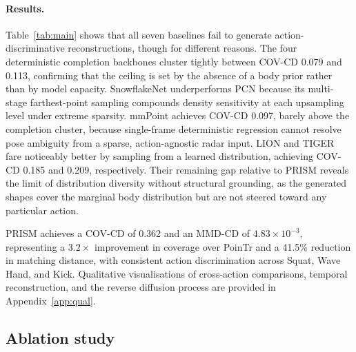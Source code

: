 \documentclass{article}
\begin{document}
\paragraph{Results.}
Table~\ref{tab:main} shows that all seven baselines fail to generate action-discriminative reconstructions, though for different reasons. The four deterministic completion backbones cluster tightly between COV-CD 0.079
and 0.113, confirming that the ceiling is set by the absence of a body prior rather
than by model capacity.
SnowflakeNet underperforms PCN because its multi-stage farthest-point sampling
compounds density sensitivity at each upsampling level under extreme sparsity. mmPoint achieves COV-CD 0.097, barely above the completion cluster, because
single-frame deterministic regression cannot resolve pose ambiguity from a sparse,
action-agnostic radar input.
LION and TIGER fare noticeably better by sampling from a learned distribution,
achieving COV-CD 0.185 and 0.209, respectively.
Their remaining gap relative to PRISM reveals the limit of distribution diversity
without structural grounding, as the generated shapes cover the marginal body
distribution but are not steered toward any particular action.

PRISM achieves a COV-CD of 0.362 and an MMD-CD of $4.83\!\times\!10^{-3}$,
representing a $3.2\times$ improvement in coverage over PoinTr and a 41.5\%
reduction in matching distance, with consistent action discrimination across
Squat, Wave Hand, and Kick.
Qualitative visualisations of cross-action comparisons, temporal reconstruction, and the reverse diffusion process are provided in Appendix~\ref{app:qual}.


\subsection{Ablation study}
\label{sec:ablation}
\end{document}
